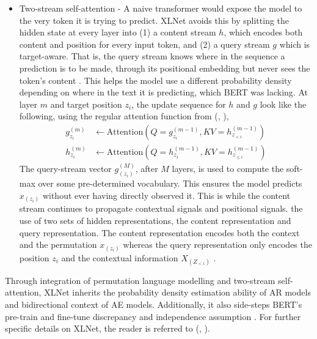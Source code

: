 \documentclass[10pt,oneside]{report}
\renewcommand{\citet}[1]{\citeauthor{#1}, \citeyear{#1}}
\begin{document}
\begin{itemize}
    \item{Two-stream self-attention - A naive transformer would expose the model to the very token it is trying to predict. XLNet avoids this by splitting the hidden state at every layer into (1) a content stream $h$, which encodes both content and position for every input token, and (2) a query stream $g$ which is target-aware. That is, the query stream knows where in the sequence a prediction is to be made, through its positional embedding but never sees the token's content \cite{vaswani2017attention, yang2019xlnet}. This helps the model use a different probability density depending on where in the text it is predicting, which BERT was lacking. At layer $m$ and target position $z_i$, the update sequence for $h$ and $g$ look like the following, using the regular attention function from (\citet{vaswani2017attention}), 
            \begin{align}
                g_{z_i}^{(m)} &\leftarrow \text{Attention} (Q = g_{z_i}^{(m - 1)}, KV = h_{z_{<i}}^{(m - 1)}) \\
                h_{z_i}^{(m)} &\leftarrow \text{Attention} (Q = h_{z_i}^{(m - 1)}, KV = h_{z_{\le i}}^{(m - 1)})
            \end{align}
            The query-stream vector $g_{(z_i)}^{(M)}$, after $M$ layers, is used to compute the soft-max \cite{gao2017properties} over some pre-determined vocabulary. This ensures the model predicts $x_{(z_i)}$ without ever having directly observed it. This is while the content stream continues to propagate contextual signals and positional signals.
        the use of two sets of hidden representations, the content representation and query representation. The content representation encodes both the context and the permutation $x_{(z_i)}$ whereas the query representation only encodes the position $z_i$ and the contextual information $X_{(Z_{<i})}$ \cite{yang2019xlnet}.}
\end{itemize}

Through integration of permutation language modelling and two-stream self-attention, XLNet inherits the probability density estimation ability of AR models and bidirectional context of AE models. Additionally, it also side-steps BERT's pre-train and fine-tune discrepancy and independence assumption \cite{yang2019xlnet}. For further specific details on XLNet, the reader is referred to (\citet{yang2019xlnet}).


\end{document}
